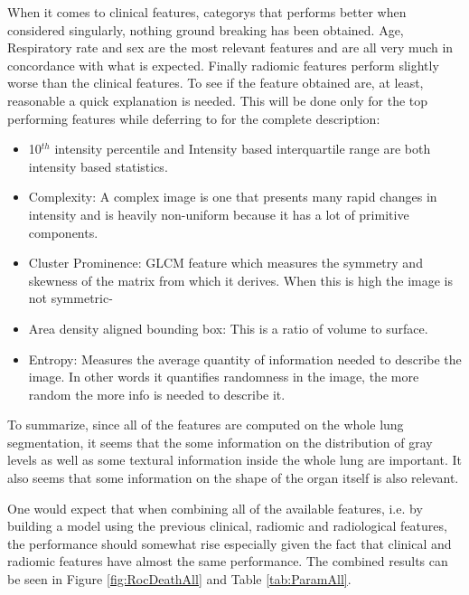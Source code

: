 When it comes to clinical features, categorys that performs better when considered singularly, nothing ground breaking has been obtained.
Age, Respiratory rate and sex are the most relevant features and are all very much in concordance with what is expected. Finally radiomic features perform slightly worse than the clinical features. To see if the feature obtained are, at least, reasonable a quick explanation is needed. 
This will be done only for the top performing features while deferring to \cite{IBSI} for the complete description:

\begin{itemize}
\item 10$^{th}$ intensity percentile and Intensity based interquartile range are both intensity based statistics.
\item Complexity: A complex image is one that presents many rapid changes in intensity and is heavily non-uniform because it has a lot of primitive components.
\item Cluster Prominence: GLCM feature which measures the symmetry and skewness of the matrix from which it derives. When this is high the image is not symmetric-
\item Area density aligned bounding box: This is a ratio of volume to surface.
\item Entropy: Measures the average quantity of information needed to describe the image. In other words it quantifies randomness in the image, the more random the more info is needed to describe it.
\end{itemize}

To summarize, since all of the features are computed on the whole lung segmentation, it seems that the some information on the distribution of gray levels as well as some textural information inside the whole lung are important.
It also seems that some information on the shape of the organ itself is also relevant.

One would expect that when combining all of the available features, i.e. by building a model using the previous clinical, radiomic and radiological features, the performance should somewhat rise especially given the fact that clinical and radiomic features have almost the same performance. The combined results can be seen in Figure \ref{fig:RocDeathAll} and Table \ref{tab:ParamAll}.

